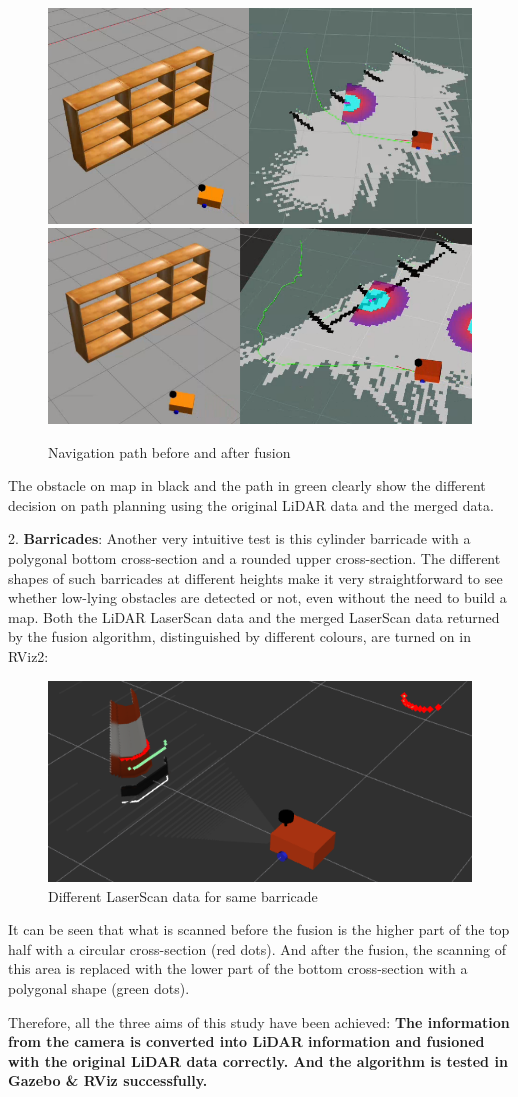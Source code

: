 \begin{figure}[H]
    \label{fig:bookshelf_navigation}
    \centering
    \includegraphics[width=0.7\linewidth]{figs/before_merge.png}
    \includegraphics[width=0.7\linewidth]{figs/after_merge.png}
    \caption{Navigation path before and after fusion}
\end{figure}
The obstacle on map in black and the path in green clearly show the different decision on path planning
using the original LiDAR data and the merged data.

2. \textbf{Barricades}: Another very intuitive test is this cylinder barricade 
with a polygonal bottom cross-section and a rounded upper cross-section.
The different shapes of such barricades at different heights make it very straightforward 
to see whether low-lying obstacles are detected or not, 
even without the need to build a map. 
Both the LiDAR LaserScan data and the merged LaserScan data returned by the fusion algorithm, 
distinguished by different colours, are turned on in RViz2:
\begin{figure}[H]
    \centering
    \includegraphics[width=0.7\linewidth]{figs/barricade.png}
    \caption{Different LaserScan data for same barricade}
\end{figure}
It can be seen that what is scanned before the fusion 
is the higher part of the top half with a circular cross-section (red dots).
And after the fusion, the scanning of this area is replaced with the lower part of the bottom cross-section 
with a polygonal shape (green dots).

Therefore, all the three aims of this study have been achieved: \textbf{The information from the camera is converted into LiDAR information
and fusioned with the original LiDAR data correctly. And the algorithm is tested in Gazebo \& RViz successfully.}



